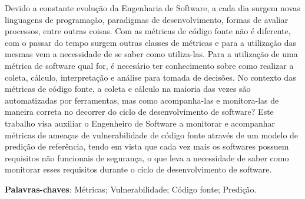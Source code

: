 \begin{resumo}

Devido a constante evolução da Engenharia de Software, a cada dia surgem 
novas linguagens de programação, paradigmas de desenvolvimento, formas de
avaliar processos, entre outras coisas. Com as métricas de código fonte não 
é diferente, com o passar do tempo surgem outras classes de métricas e para
a utilização das mesmas vem a necessidade de se saber como utiliza-las. Para a
utilização de uma métrica de software qual for, é necesário ter conhecimento
sobre como realizar a coleta, cálculo, interpretação e análise para tomada de
decisões. No contexto das métricas de código fonte, a coleta e cálculo na
maioria das vezes são automatizadas por ferramentas, mas como acompanha-las e
monitora-las de maneira correta no decorrer do ciclo de desenvolvimento de
software? Este trabalho visa auxiliar o Engenheiro de Software a monitorar e
acompanhar métricas de ameaças de vulnerabilidade de código fonte através de um
modelo de predição de referência, tendo em vista que cada vez mais os softwares
possuem requisitos não funcionais de segurança, o que leva a necessidade de saber
como monitorar esses requisitos durante o ciclo de desenvolvimento de software.

 \vspace{\onelineskip}
    
 \noindent
 \textbf{Palavras-chaves}: Métricas; Vulnerabilidade; Código fonte; Predição.
\end{resumo}
